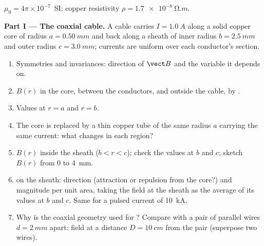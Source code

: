 \begin{problem}
\label{pb:b1:magnetostatics:1}
$\mu_0 = 4\pi \times 10^{-7}$~SI; copper resistivity $\rho = \qty{1.7e-8}{\ohm.m}$.

\medskip
\noindent\textbf{Part I --- The coaxial cable.}
A cable carries $I = \qty{1.0}{A}$ along a solid copper core of radius
$a = \qty{0.50}{mm}$ and back along a sheath of inner radius $b =
\qty{2.5}{mm}$ and outer radius $c = \qty{3.0}{mm}$; currents are uniform
over each conductor's section.
\begin{enumerate}
  \item Symmetries and invariances: direction of $\vect B$ and the
        variable it depends on.
  \item $B(r)$ in the core, between the conductors, and outside the
        cable, by .
  \item Values at $r = a$ and $r = b$.
  \item The core is replaced by a thin copper tube of the same radius
        $a$ carrying the same current: what changes in each region?
  \item $B(r)$ inside the sheath ($b < r < c$); check the values at $b$
        and $c$; sketch $B(r)$ from $0$ to \qty{4}{mm}.
  \item {} on the sheath: direction (attraction or
        repulsion from the core?) and magnitude per unit area, taking the
        field at the sheath as the average of its values at $b$ and $c$.
        Same for a pulsed current of \qty{10}{kA}.
  \item Why is the coaxial geometry used for ? Compare with a
        pair of parallel wires $d = \qty{2}{mm}$ apart: field at a distance
        $D = \qty{10}{cm}$ from the pair (superpose two wires).
\end{enumerate}


\end{problem}
